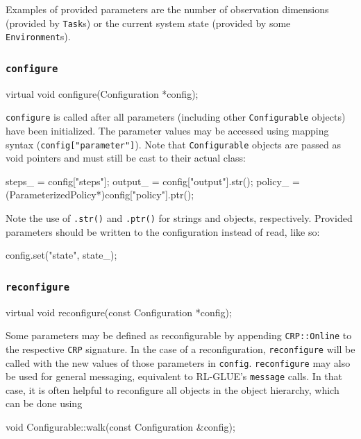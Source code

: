 \documentclass{article}
\newcommand{\txt}[1]{\texttt{#1}}
\newenvironment{code}{\alltt}{\endalltt}
\begin{document}
Examples of provided parameters are the number of observation dimensions
(provided by \txt{Task}s) or the current system state (provided by some
\txt{Environment}s).

\subsubsection{\txt{configure}}

\begin{code}
virtual void configure(Configuration *config);
\end{code}

\txt{configure} is called after all parameters (including other
\txt{Configurable} objects) have been initialized. The parameter values may
be accessed using mapping syntax (\txt{config["parameter"]}). Note that
\txt{Configurable} objects are passed as void pointers and must still be cast to
their actual class:

\begin{code}
steps_ = config["steps"];  
output_ = config["output"].str();
policy_ = (ParameterizedPolicy*)config["policy"].ptr();
\end{code}

Note the use of \txt{.str()} and \txt{.ptr()} for strings and objects,
respectively. Provided parameters should be written to the configuration
instead of read, like so:

\begin{code}
config.set("state", state_);
\end{code}

\subsubsection{\txt{reconfigure}}
\begin{code}
virtual void reconfigure(const Configuration *config);
\end{code}

Some parameters may be defined as reconfigurable by appending
\txt{CRP::Online} to the respective \txt{CRP} signature. In the case of a
reconfiguration, \txt{reconfigure} will be called with the new values of
those parameters in \txt{config}. \txt{reconfigure} may also be used for
general messaging, equivalent to RL-GLUE's \txt{message} calls. In that
case, it is often helpful to reconfigure all objects in the object
hierarchy, which can be done using

\begin{code}
void Configurable::walk(const Configuration &config);
\end{code}
\end{document}
